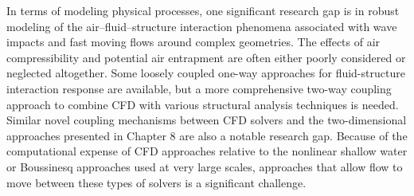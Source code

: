 In terms of modeling physical processes, one significant research gap is in robust modeling of the air--fluid--structure interaction phenomena associated with wave impacts and fast moving flows around complex geometries.  The effects of air compressibility and potential air entrapment are often either poorly considered or neglected altogether.  Some loosely coupled one-way approaches for fluid-structure interaction response are available, but a more comprehensive two-way coupling approach to combine CFD with various structural analysis techniques is needed.  Similar novel coupling mechanisms between CFD solvers and the two-dimensional approaches presented in Chapter 8 are also a notable research gap.  Because of the computational expense of CFD approaches relative to the nonlinear shallow water or Boussinesq approaches used at very large scales, approaches that allow flow to move between these types of solvers is a significant challenge.
